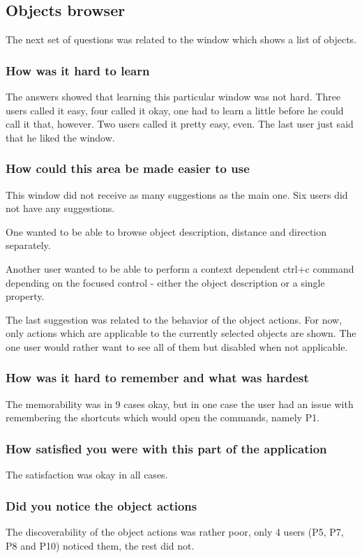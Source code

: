 \documentclass[nolof,digital]{fithesis3}
\begin{document}
\subsection{Objects browser}
The next set of questions was related to the window which shows a list of objects.
\subsubsection{How was it hard to learn}
The answers showed that learning this particular window was not hard. Three users called it easy, four called it okay, one had to learn a little before he could call it that, however. Two users called it pretty easy, even. The last user just said that he liked the window.
\subsubsection{How could this area be made easier to use}
This window did not receive as many suggestions as the main one. Six users did not have any suggestions.

One wanted to be able to browse object description, distance and direction separately.

Another user wanted to be able to perform a context dependent ctrl+c command depending on the focused control - either the object description or a single property.

The last suggestion was related to the behavior of the object actions. For now, only actions which are applicable to the currently selected objects are shown. The one user would rather want to see all of them but disabled when not applicable.
\subsubsection{How was it hard to remember and what was hardest}
The memorability was in 9 cases okay, but in one case the user had an issue with remembering the shortcuts which would open the commands, namely P1.
\subsubsection{How satisfied you were with this part of the application}
The satisfaction was okay in all cases.
\subsubsection{Did you notice the object actions}
The discoverability of the object actions was rather poor, only 4 users (P5, P7, P8 and P10) noticed them, the rest did not.
\end{document}
